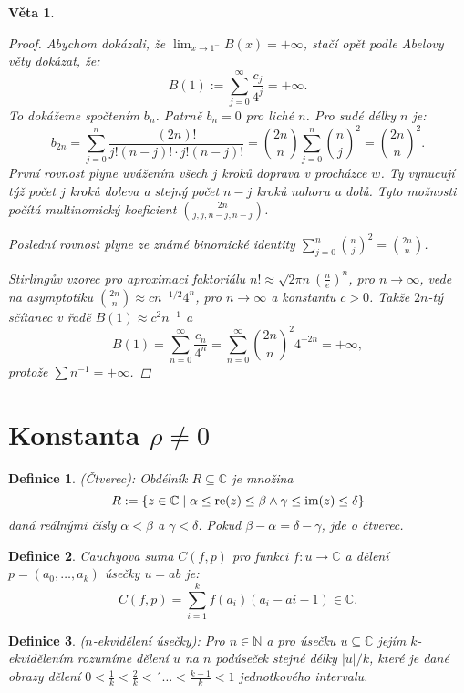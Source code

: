 \documentclass[10pt,a4paper]{article}
\newcommand{\Cc}{{\mathbb{C}}}      %
\newcommand{\N}{{\mathbb{N}}}       %
\newcommand{\im}{\normalfont{\text{im}}}   		%
\newcommand{\re}{\normalfont{\text{re}}}   		%
\newtheorem*{thm}{Věta}
\newtheorem{Def}{Definice}[section]
\begin{document}
\begin{thm}
\begin{proof}
		Abychom dokázali, že $\lim_{x\to1^-} B(x) = +\infty$, stačí opět podle \textit{Abelovy věty} dokázat, že:
		\[
			B(1) := \sum_{j=0}^{\infty}\frac{c_j}{4^j} = +\infty.
		\]To dokážeme spočtením $b_n$. 
		Patrně $b_n = 0$ pro liché $ n $. 
		Pro sudé délky $ n $ je:
		\[
			b_{2n} = \sum_{j=0}^{n}\frac{(2n)!}{j!(n-j)! \cdot j!(n-j)!} = \binom{2n}{n} \sum_{j=0}^{n}\binom{n}{j}^2 = \binom{2n}{n}^2.
		\]
		První rovnost plyne uvážením všech $j$ kroků doprava v procházce $ w $. 
		Ty vynucují týž počet $ j $ kroků doleva a stejný počet $n - j$ kroků nahoru a dolů. 
		Tyto možnosti počítá multinomický koeficient $\binom{2n}{j,j,n-j, n-j}$.
		
		Poslední rovnost plyne ze známé binomické identity $\displaystyle\sum_{j=0}^{n}\binom nj^2=\binom{2n}n$.
		
		Stirlingův vzorec pro aproximaci faktoriálu $n! \approx \sqrt{2\pi n} \left(\frac{n}{e}\right)^n$, pro $n\to \infty$, vede na asymptotiku $ \binom{2n}{n}\approx cn^{-1/2}4^n $, pro $n\to \infty$ a konstantu $c>0$.
		Takže $2n$-tý sčítanec v řadě $B(1) \approx c^2 n^{-1}$ a 
		\[
			B(1) = \sum_{n=0}^{\infty}\frac{c_n}{4^n} = \sum_{n=0}^{\infty}\binom{2n}{n}^2 4^{-2n} = +\infty,
		\]
		protože $\sum n^{-1} = +\infty$.
	\end{proof}
\end{thm}


\section{Konstanta $ \rho \neq 0$}

\begin{Def}(Čtverec): \normalfont
	Obdélník $R \subseteq \Cc$ je množina $$R := \{z \in \Cc \mid \alpha \leq \re(z) \leq \beta \land \gamma \leq \im(z) \leq \delta\}$$
	daná reálnými čísly $\alpha < \beta$ a $\gamma < \delta$. 
	Pokud $\beta - \alpha = \delta - \gamma$, jde o čtverec.
\end{Def}

\begin{Def} Cauchyova suma \normalfont $ C(f,p) $ pro funkci $ f: u\to \Cc $ a dělení $ p = (a_0, \ldots, a_k) $ úsečky $u=ab$ je: $$ C(f,p) = \sum_{i=1}^{k}f(a_i)(a_i-a{i-1}) \in \Cc .$$
\end{Def}

\begin{Def}($ n $-ekvidělení úsečky): \normalfont
	Pro $n \in \N$ a pro úsečku $u \subseteq \Cc$ jejím $ k $-ekvidělením rozumíme dělení $ u $ na $ n $ podúseček stejné délky $|u|/k$, které je dané obrazy dělení $0 < \frac 1k < \frac 2k < ´\ldots < \frac{k-1}{k} < 1$ jednotkového intervalu.
\end{Def}
\end{document}
